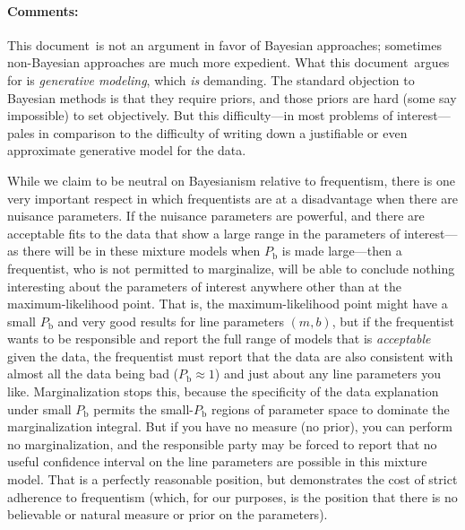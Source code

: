 \documentclass[12pt,twoside]{article}
\newcommand{\documentname}{document}
\newcommand{\commentsname}{Comments}
\newcounter{problem}
\newenvironment{comments}{\paragraph{\commentsname:}}{}
\newcommand{\Pbad}{P_{\mathrm{b}}}
\begin{document}
\begin{comments}
This \documentname\ is not an argument in favor of Bayesian
approaches; sometimes non-Bayesian approaches are much more expedient.
What this \documentname\ argues for is \emph{generative modeling},
which \emph{is} demanding.  The standard objection to Bayesian methods
is that they require priors, and those priors are hard (some say
impossible) to set objectively.  But this difficulty---in most
problems of interest---pales in comparison to the difficulty of
writing down a justifiable or even approximate generative model for
the data.

While we claim to be neutral on Bayesianism relative to frequentism,
there is one very important respect in which frequentists are at a
disadvantage when there are nuisance parameters.  If the nuisance
parameters are powerful, and there are acceptable fits to the data
that show a large range in the parameters of interest---as there will
be in these mixture models when $\Pbad$ is made large---then a
frequentist, who is not permitted to marginalize, will be able to
conclude nothing interesting about the parameters of interest anywhere
other than at the maximum-likelihood point.  That is, the
maximum-likelihood point might have a small $\Pbad$ and very good
results for line parameters $(m,b)$, but if the frequentist wants to
be responsible and report the full range of models that is
\emph{acceptable} given the data, the frequentist must report that the
data are also consistent with almost all the data being bad
($\Pbad\approx 1$) and just about any line parameters you like.
Marginalization stops this, because the specificity of the data
explanation under small $\Pbad$ permits the small-$\Pbad$ regions of
parameter space to dominate the marginalization integral.  But if you
have no measure (no prior), you can perform no marginalization, and
the responsible party may be forced to report that no useful
confidence interval on the line parameters are possible in this
mixture model.  That is a perfectly reasonable position, but
demonstrates the cost of strict adherence to frequentism (which, for
our purposes, is the position that there is no believable or natural
measure or prior on the parameters).
\end{comments}
\end{document}
